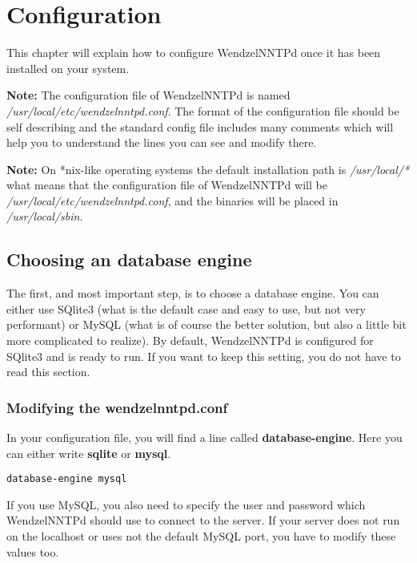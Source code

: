 \chapter{Configuration}

This chapter will explain how to configure WendzelNNTPd once it has been installed on your system.

{\bf Note:} The configuration file of WendzelNNTPd is named {\it /usr/local/etc/wendzelnntpd.conf}. The format of the configuration file should be self describing and the standard config file includes many comments which will help you to understand the lines you can see and modify there.

{\bf Note:} On *nix-like operating systems the default installation path is {\it /usr/local/*} what means that the configuration file of WendzelNNTPd will be {\it /usr/local/etc/wendzelnntpd.conf}, and the binaries will be placed in {\it /usr/local/sbin}. %

\section{Choosing an database engine}

The first, and most important step, is to choose a database engine. You can either use SQlite3 (what is the default case and easy to use, but not very performant) or MySQL (what is of course the better solution, but also a little bit more complicated to realize). By default, WendzelNNTPd is configured for SQlite3 and is ready to run. If you want to keep this setting, you do not have to read this section.

\subsection{Modifying the wendzelnntpd.conf}

In your configuration file, you will find a line called {\bf database-engine}. Here you can either write {\bf sqlite} or {\bf mysql}.

\begin{verbatim}
database-engine mysql
\end{verbatim}

If you use MySQL, you also need to specify the user and password which WendzelNNTPd should use to connect to the server. If your server does not run on the localhost or uses not the default MySQL port, you have to modify these values too.


